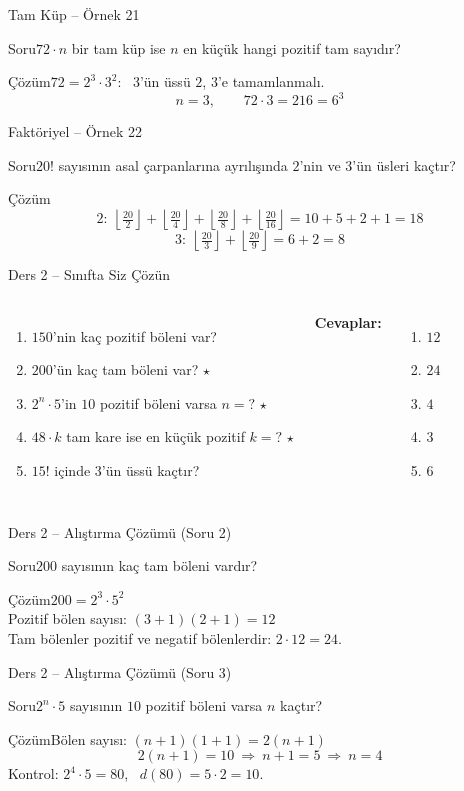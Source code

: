 \documentclass[aspectratio=169,11pt,handout]{beamer}
\newcommand{\soru}[3]{%
\begin{frame}{#1}
  \begin{block}{Soru}\large #2\end{block}
  \pause
  \begin{exampleblock}{Çözüm}\large #3\end{exampleblock}
\end{frame}}
\begin{document}
\soru{Tam Küp -- Örnek 21}
{\(72\cdot n\) bir tam küp ise \(n\) en küçük hangi pozitif tam sayıdır?}
{\(72=2^3\cdot 3^2\): \ \(3\)'ün üssü \(2\), \(3\)'e tamamlanmalı.
\[n=3,\qquad 72\cdot 3=216=6^3\]}

\soru{Faktöriyel -- Örnek 22}
{\(20!\) sayısının asal çarpanlarına ayrılışında \(2\)'nin ve \(3\)'ün üsleri kaçtır?}
{\[2:\ \left\lfloor\tfrac{20}{2}\right\rfloor+\left\lfloor\tfrac{20}{4}\right\rfloor+\left\lfloor\tfrac{20}{8}\right\rfloor+\left\lfloor\tfrac{20}{16}\right\rfloor=10+5+2+1=18\]
\[3:\ \left\lfloor\tfrac{20}{3}\right\rfloor+\left\lfloor\tfrac{20}{9}\right\rfloor=6+2=8\]}

\begin{frame}{Ders 2 -- Sınıfta Siz Çözün}
\begin{columns}[t]
\begin{enumerate}
\item \(150\)'nin kaç pozitif böleni var?
\item \(200\)'ün kaç tam böleni var? \(\star\)
\item \(2^n\cdot 5\)'in \(10\) pozitif böleni varsa \(n=?\) \(\star\)
\item \(48\cdot k\) tam kare ise en küçük pozitif \(k=?\) \(\star\)
\item \(15!\) içinde \(3\)'ün üssü kaçtır?
\end{enumerate}
\pause
\textbf{Cevaplar:}
\begin{enumerate}
\item \(12\)
\item \(24\)
\item \(4\)
\item \(3\)
\item \(6\)
\end{enumerate}
\end{columns}
\vspace{4pt}{\footnotesize \(\star\) işaretli soruların adım adım çözümü sonraki slaytlardadır.}
\end{frame}

\soru{Ders 2 -- Alıştırma Çözümü (Soru 2)}
{\(200\) sayısının kaç tam böleni vardır?}
{\(200=2^3\cdot 5^2\)\\[3pt]
Pozitif bölen sayısı: \((3+1)(2+1)=12\)\\[3pt]
Tam bölenler pozitif ve negatif bölenlerdir: \(2\cdot 12=24\).}

\soru{Ders 2 -- Alıştırma Çözümü (Soru 3)}
{\(2^n\cdot 5\) sayısının \(10\) pozitif böleni varsa \(n\) kaçtır?}
{Bölen sayısı: \((n+1)(1+1)=2(n+1)\)
\[2(n+1)=10\ \Rightarrow\ n+1=5\ \Rightarrow\ n=4\]
Kontrol: \(2^4\cdot 5=80\), \ \(d(80)=5\cdot 2=10\).}
\end{document}
